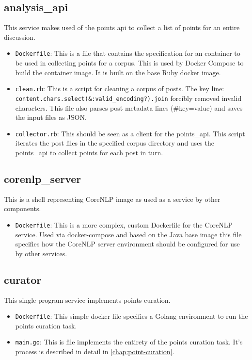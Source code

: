 \subsection*{analysis\_api}
  This service makes used of the points api to collect a list of points for an entire discussion.
  \begin{itemize}
    \item
      \texttt{Dockerfile}: This is a file that contains the specification for an container to be used in collecting points for a corpus. This is used by Docker Compose to build the container image. It is built on the base Ruby docker image.
    \item
      \texttt{clean.rb}: This is a script for cleaning a corpus of posts. The key line: \texttt{content.chars.select(\&:valid\_encoding?).join} forcibly removed invalid characters. This file also parses post metadata lines (\#key=value) and saves the input files as JSON.
    \item
      \texttt{collector.rb}: This should be seen as a client for the points\_api. This script iterates the post files in the specified corpus directory and uses the points\_api to collect points for each post in turn.
  \end{itemize}

\subsection*{corenlp\_server}
  This is a shell representing CoreNLP image as used as a service by other components.
  \begin{itemize}
    \item
      \texttt{Dockerfile}: This is a more complex, custom Dockerfile for the CoreNLP service. Used via docker-compose and based on the Java base image this file specifies how the CoreNLP server environment should be configured for use by other services.
  \end{itemize}

\subsection*{curator}
  This single program service implements points curation.
  \begin{itemize}
    \item
      \texttt{Dockerfile}: This simple docker file specifies a Golang environment to run the points curation task.
    \item
      \texttt{main.go}: This is file implements the entirety of the points curation task. It's process is described in detail in \ref{chap:point-curation}.
  \end{itemize}

